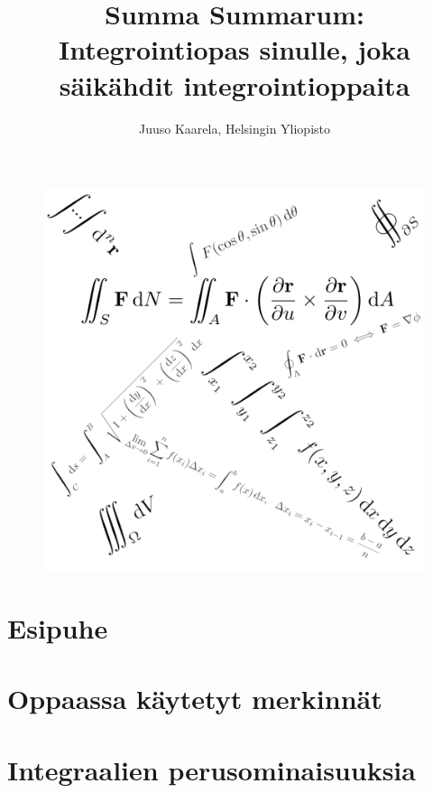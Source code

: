 \documentclass{article}%
\title{\huge{\textbf{Summa Summarum: \\ Integrointiopas sinulle, joka säikähdit integrointioppaita}}}%
\author{\LARGE{Juuso Kaarela, Helsingin Yliopisto}}%
\date{}
\numberwithin{equation}{section}
\numberwithin{figure}{section}
\numberwithin{table}{section}
\begin{document}
%
\normalsize%
\maketitle%

\begin{figure}[h!]
	\centering
	\includegraphics[width=0.9\linewidth]{TitlePhoto.png}
\end{figure}

\pagebreak

\tableofcontents

\pagebreak

\section{Esipuhe}



\pagebreak

\section{Oppaassa käytetyt merkinnät}



\pagebreak

\section{Integraalien perusominaisuuksia}
\end{document}
